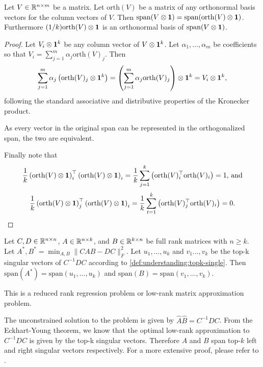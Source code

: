 \begin{lemma}\label{lem:understanding:orth_kronecker}
    Let $V \in \mathbb{R}^{n \times m}$ be a matrix. Let $\mathrm{orth}(V)$ be a matrix of any orthonormal basis vectors for the column vectors of $V$. Then $\mathrm{span}(V\otimes {\bm{1}}) = \mathrm{span}(\mathrm{orth}(V) \otimes {\bm{1}})$. Furthermore $(1/k) \mathrm{orth}(V) \otimes {\bm{1}}$ is an orthonormal basis of $\mathrm{span}(V \otimes {\bm{1}})$.
\end{lemma}

\begin{proof}
    Let $V_i \otimes {\bm{1}}^k$ be any column vector of $V\otimes {\bm{1}}^k$. Let $\alpha_1,\dots,\alpha_m$ be coefficients so that $V_i = \sum_{j=1}^m \alpha_j \mathrm{orth}(V)_j$. Then $$\sum_{j=1}^m \alpha_j \left(\mathrm{orth}(V)_j \otimes {\bm{1}}^k\right) = \left(\sum_{j=1}^m \alpha_j \mathrm{orth}(V)_j\right) \otimes {\bm{1}}^k = V_i \otimes {\bm{1}}^k,$$ following the standard associative and distributive properties of the Kronecker product.

    As every vector in the original span can be represented in the orthogonalized span, the two are equivalent.

    Finally note that $$\frac{1}{k}\left(\mathrm{orth}(V) \otimes {\bm{1}}\right)_i^\top \left(\mathrm{orth}(V) \otimes {\bm{1}}\right)_i = \frac{1}{k}\sum_{j=1}^k \left(\mathrm{orth}(V)_i^\top \mathrm{orth}(V)_i\right) = 1,\,\text{and}$$ $$\frac{1}{k}\left(\mathrm{orth}(V) \otimes {\bm{1}}\right)_j^\top \left(\mathrm{orth}(V) \otimes {\bm{1}}\right)_i = \frac{1}{k}\sum_{t=1}^k \left(\mathrm{orth}(V)_j^\top \mathrm{orth}(V)_i\right) = 0.$$
\end{proof}

\begin{lemma}\label{lem:understanding:rrr}
    Let $C,D \in \mathbb{R}^{n \times n}$, $A\in\mathbb{R}^{n \times k}$, and $B\in\mathbb{R}^{k \times n}$ be full rank matrices with $n \geq k$. Let $A^*, B^* = \min_{A,B} \lVert CAB - DC\rVert^2_F$. Let ${u_1,\dots,u_k}$ and ${v_1\dots,v_k}$ be the top-k singular vectors of $C^{-1}DC$ according to \autoref{def:understanding:topk-single}. Then $\mathrm{span}(A^*) = \mathrm{span}({u_1,\dots,u_k})$ and $\mathrm{span}(B) = \mathrm{span}({v_1,\dots,v_k})$.
\end{lemma}

This is a reduced rank regression problem \parencite{izenman1975reduced} or low-rank matrix approximation problem. 

The unconstrained solution to the problem is given by $\hat{A}\hat{B} = C^{-1}DC$. From the Eckhart-Young theorem, we know that the optimal low-rank approximation to $C^{-1}DC$ is given by the top-k singular vectors.
Therefore $A$ and $B$ span top-$k$ left and right singular vectors respectively.
For a more extensive proof, please refer to \textcite{izenman1975reduced}.

